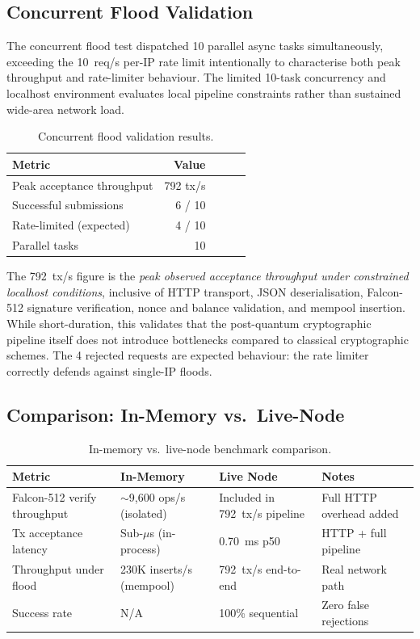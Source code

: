 \documentclass[11pt,a4paper]{article}
\begin{document}
\subsection{Concurrent Flood Validation}

The concurrent flood test dispatched 10 parallel async tasks simultaneously,
exceeding the 10~req/s per-IP rate limit intentionally to characterise
both peak throughput and rate-limiter behaviour. The limited 10-task concurrency and localhost environment evaluates local pipeline constraints rather than sustained wide-area network load.

\begin{table}[h]
\centering\small
\begin{tabular}{@{}lrrrr@{}}
\toprule
\textbf{Metric} & \textbf{Value} \\
\midrule
Peak acceptance throughput & 792 tx/s \\
Successful submissions & 6 / 10 \\
Rate-limited (expected) & 4 / 10 \\
Parallel tasks & 10 \\
\bottomrule
\end{tabular}
\caption{Concurrent flood validation results.}
\label{tab:liveflood}
\end{table}

The 792~tx/s figure is the \emph{peak observed acceptance throughput under constrained localhost conditions}, inclusive of HTTP
transport, JSON deserialisation, Falcon-512 signature verification, nonce
and balance validation, and mempool insertion. While short-duration, this validates that the post-quantum cryptographic pipeline itself does not introduce bottlenecks compared to classical
cryptographic schemes. The 4 rejected requests are expected behaviour: the
rate limiter correctly defends against single-IP floods.

\subsection{Comparison: In-Memory vs.\ Live-Node}

\begin{table}[h]
\centering\small
\begin{tabular}{@{}lllp{4.5cm}@{}}
\toprule
\textbf{Metric} & \textbf{In-Memory} & \textbf{Live Node} & \textbf{Notes} \\
\midrule
Falcon-512 verify throughput & $\sim$9,600 ops/s (isolated) & Included in 792~tx/s pipeline & Full HTTP overhead added \\
Tx acceptance latency & Sub-$\mu$s (in-process) & 0.70~ms p50 & HTTP + full pipeline \\
Throughput under flood & 230K inserts/s (mempool) & 792~tx/s end-to-end & Real network path \\
Success rate & N/A & 100\% sequential & Zero false rejections \\
\bottomrule
\end{tabular}
\caption{In-memory vs.\ live-node benchmark comparison.}
\label{tab:compare}
\end{table}
\end{document}
